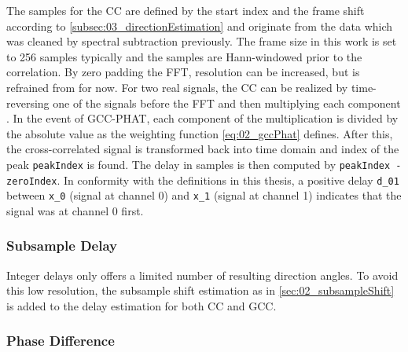 The samples for the \ac{CC} are defined by the start index and the frame shift
according to \cref{subsec:03_directionEstimation} and originate from the data which was
cleaned by spectral subtraction previously.
The frame size in this work is set to 256 samples typically  and the samples are Hann-windowed
prior to the correlation.
By zero padding the \ac{FFT}, resolution can be increased, but is refrained from for now. 
For two real signals, the \ac{CC} can be realized by time-reversing one of the signals before
the \ac{FFT} and then multiplying each component .
In the event  of \ac{GCC-PHAT}, each component of the multiplication is divided by the absolute
value as the weighting function \cref{eq:02_gccPhat} defines.
After this, the cross-correlated signal is transformed back into time domain and
index of the peak \lstinline!peakIndex! is found.
The delay in samples is then computed by \lstinline!peakIndex - zeroIndex!.
In conformity with the definitions in this thesis, a positive delay \lstinline!d_01!
between \lstinline!x_0! (signal at channel 0) and \lstinline!x_1! (signal at channel 1)
indicates that the signal was at channel 0 first.

\subsubsection*{Subsample Delay}
\label{subsubsec:03_subsample}

Integer delays only offers a limited number of resulting direction angles.
To avoid this low resolution, the subsample shift estimation as in \cref{sec:02_subsampleShift}
is added to the delay estimation for both \ac{CC} and \ac{GCC}. 

\subsubsection{Phase Difference}
\label{subsubsec:03_phase}

